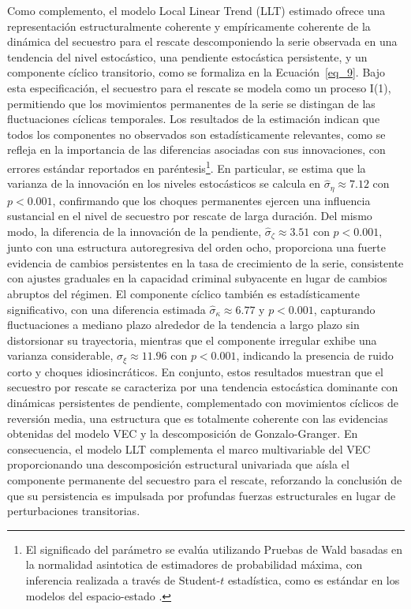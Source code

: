 \documentclass[12pt]{article}
\providecommand{\parencite}{\citep}
\theoremstyle{definition}
\theoremstyle{remark}
\newcommand{\1}{\mathbf{1}}
\begin{document}
Como complemento, el modelo Local Linear Trend (LLT) estimado ofrece una representación estructuralmente coherente y empíricamente coherente de la dinámica del secuestro para el rescate descomponiendo la serie observada en una tendencia del nivel estocástico, una pendiente estocástica persistente, y un componente cíclico transitorio, como se formaliza en la Ecuación~\ref{eq_9}. Bajo esta especificación, el secuestro para el rescate se modela como un proceso I(1), permitiendo que los movimientos permanentes de la serie se distingan de las fluctuaciones cíclicas temporales. Los resultados de la estimación indican que todos los componentes no observados son estadísticamente relevantes, como se refleja en la importancia de las diferencias asociadas con sus innovaciones, con errores estándar reportados en paréntesis\footnote{El significado del parámetro se evalúa utilizando Pruebas de Wald basadas en la normalidad asintotica de estimadores de probabilidad máxima, con inferencia realizada a través de Student-\(t\) estadística, como es estándar en los modelos del espacio-estado \parencite{ Wald1943, Greene2012}.}. En particular, se estima que la varianza de la innovación en los niveles estocásticos se calcula en $\hat{\sigma}_{\eta} \approx 7.12$ con $p<0.001$, confirmando que los choques permanentes ejercen una influencia sustancial en el nivel de secuestro por rescate de larga duración. Del mismo modo, la diferencia de la innovación de la pendiente, $\hat{\sigma}_{\zeta} \approx 3.51$ con $p<0.001$, junto con una estructura autoregresiva del orden ocho, proporciona una fuerte evidencia de cambios persistentes en la tasa de crecimiento de la serie, consistente con ajustes graduales en la capacidad criminal subyacente en lugar de cambios abruptos del régimen. El componente cíclico también es estadísticamente significativo, con una diferencia estimada $\hat{\sigma}_{\kappa} \approx 6.77$ y $p<0.001$, capturando fluctuaciones a mediano plazo alrededor de la tendencia a largo plazo sin distorsionar su trayectoria, mientras que el componente irregular exhibe una varianza considerable, $\hat{\sigma}_{\xi} \approx 11.96$ con $p<0.001$, indicando la presencia de ruido corto y choques idiosincráticos. En conjunto, estos resultados muestran que el secuestro por rescate se caracteriza por una tendencia estocástica dominante con dinámicas persistentes de pendiente, complementado con movimientos cíclicos de reversión media, una estructura que es totalmente coherente con las evidencias obtenidas del modelo VEC y la descomposición de Gonzalo-Granger. En consecuencia, el modelo LLT complementa el marco multivariable del VEC proporcionando una descomposición estructural univariada que aísla el componente permanente del secuestro para el rescate, reforzando la conclusión de que su persistencia es impulsada por profundas fuerzas estructurales en lugar de perturbaciones transitorias.
\end{document}

